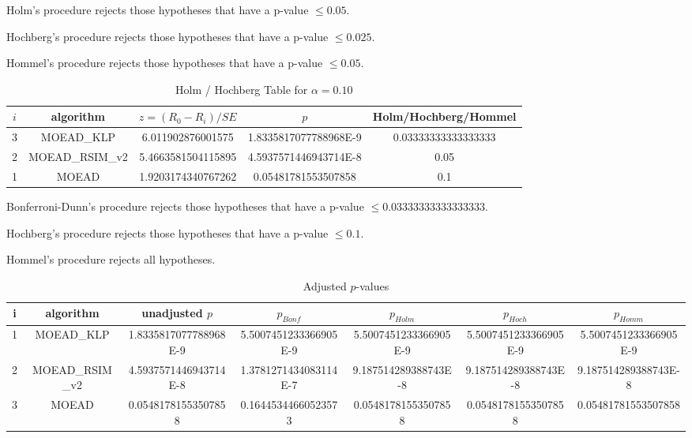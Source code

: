 \documentclass[a4paper,10pt]{article}
\begin{document}
\begin{landscape}
Holm's procedure rejects those hypotheses that have a p-value $\le0.05$.


Hochberg's procedure rejects those hypotheses that have a p-value $\le0.025$.


Hommel's procedure rejects those hypotheses that have a p-value $\le0.05$.


\begin{table}[!htp]
\centering\tiny
\caption{Holm / Hochberg Table for $\alpha=0.10$}
\begin{tabular}{ccccc}
$i$&algorithm&$z=(R_0 - R_i)/SE$&$p$&Holm/Hochberg/Hommel\\
\hline
3&MOEAD_KLP&6.011902876001575&1.8335817077788968E-9&0.03333333333333333\\
2&MOEAD_RSIM_v2&5.4663581504115895&4.5937571446943714E-8&0.05\\
1&MOEAD&1.9203174340767262&0.05481781553507858&0.1\\
\hline
\end{tabular}
\end{table}
Bonferroni-Dunn's procedure rejects those hypotheses that have a p-value $\le0.03333333333333333$.


Hochberg's procedure rejects those hypotheses that have a p-value $\le0.1$.


Hommel's procedure rejects all hypotheses.


\begin{table}[!htp]
\centering\tiny
\caption{Adjusted $p$-values}
\begin{tabular}{ccccccc}
i&algorithm&unadjusted $p$&$p_{Bonf}$&$p_{Holm}$&$p_{Hoch}$&$p_{Homm}$\\
\hline
1&MOEAD_KLP&1.8335817077788968E-9&5.5007451233366905E-9&5.5007451233366905E-9&5.5007451233366905E-9&5.5007451233366905E-9\\
2&MOEAD_RSIM_v2&4.5937571446943714E-8&1.3781271434083114E-7&9.187514289388743E-8&9.187514289388743E-8&9.187514289388743E-8\\
3&MOEAD&0.05481781553507858&0.16445344660523573&0.05481781553507858&0.05481781553507858&0.05481781553507858\\
\hline
\end{tabular}
\end{table}


\end{landscape}
\end{document}
